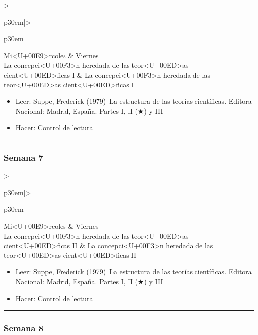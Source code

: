 \documentclass[spanish,]{article}
\begin{document}
\begin{tabular}{>{\raggedright\arraybackslash}p{30em}|>{\raggedright\arraybackslash}p{30em}}
\hline
Mi<U+00E9>rcoles & Viernes\\
\hline
La concepci<U+00F3>n heredada de las teor<U+00ED>as cient<U+00ED>ficas I & La concepci<U+00F3>n heredada de las teor<U+00ED>as cient<U+00ED>ficas I\\
\hline
\end{tabular}

\begin{itemize}
\item
  Leer: Suppe, Frederick (1979)~La estructura de las teorías
  científicas. Editora Nacional: Madrid, España. Partes I, II (★) y III
\item
  Hacer: Control de lectura
\end{itemize}

\begin{center}\rule{0.5\linewidth}{\linethickness}\end{center}

\subsubsection{Semana 7}\label{semana-7}

\begin{tabular}{>{\raggedright\arraybackslash}p{30em}|>{\raggedright\arraybackslash}p{30em}}
\hline
Mi<U+00E9>rcoles & Viernes\\
\hline
La concepci<U+00F3>n heredada de las teor<U+00ED>as cient<U+00ED>ficas II & La concepci<U+00F3>n heredada de las teor<U+00ED>as cient<U+00ED>ficas II\\
\hline
\end{tabular}

\begin{itemize}
\item
  Leer: Suppe, Frederick (1979)~La estructura de las teorías
  científicas. Editora Nacional: Madrid, España. Partes I, II (★) y III
\item
  Hacer: Control de lectura
\end{itemize}

\begin{center}\rule{0.5\linewidth}{\linethickness}\end{center}

\subsubsection{Semana 8}\label{semana-8}
\end{document}
